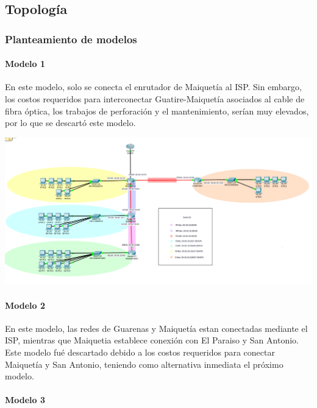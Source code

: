 \documentclass[]{article}
\begin{document}
\newpage

\subsection{Topología}\label{topologuxeda}

\subsubsection{Planteamiento de modelos}\label{planteamiento-de-modelos}

\paragraph{Modelo 1}\label{modelo-1}

En este modelo, solo se conecta el enrutador de Maiquetía al ISP. Sin
embargo, los costos requeridos para interconectar Guatire-Maiquetía
asociados al cable de fibra óptica, los trabajos de perforación y el
mantenimiento, serían muy elevados, por lo que se descartó este modelo.

\includegraphics{ModeloAlternoCostosos.png}\\

\paragraph{Modelo 2}\label{modelo-2}

En este modelo, las redes de Guarenas y Maiquetía estan conectadas
mediante el ISP, mientras que Maiquetia establece conexión con El
Paraiso y San Antonio. Este modelo fué descartado debido a los costos
requeridos para conectar Maiquetía y San Antonio, teniendo como
alternativa inmediata el próximo modelo.

\paragraph{Modelo 3}\label{modelo-3}
\end{document}
